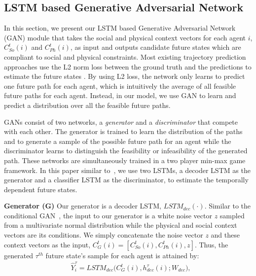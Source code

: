 \documentclass[10pt,twocolumn,letterpaper]{article}
\begin{document}
\subsection{LSTM based Generative Adversarial Network}
\label{sec:Generator}
In this section, we present our LSTM based Generative Adversarial Network (GAN) module that takes the social and physical context vectors for each agent $i$, $C^t_{So}(i)$ and $C^t_{Ph}(i)$, as input and outputs candidate future states which are compliant to social and physical constraints. Most existing trajectory prediction approaches use the L2 norm loss between the ground truth and the predictions to estimate the future states \cite{sadeghian2017car}. By using L2 loss, the network only learns to predict one future path for each agent, which is intuitively the average of all feasible future paths for each agent. Instead, in our model, we use GAN to learn and predict a distribution over all the feasible future paths.

GANs consist of two networks, a \emph{generator} and a \emph{discriminator} that compete with each other. The generator is trained to learn the distribution of the paths and to generate a sample of the possible future path for an agent while the discriminator learns to distinguish the feasibility or infeasibility of the generated path. These networks are simultaneously trained in a two player min-max game framework. In this paper similar to~\cite{gupta2018social}, we use two LSTMs, a decoder LSTM as the generator and a classifier LSTM as the discriminator, to estimate the temporally dependent future states.




\textbf{Generator (G)} Our generator is a decoder LSTM, $LSTM_{dec}(\cdot)$. Similar to the conditional GAN~\cite{mirza2014conditional}, the input to our generator is a white noise vector $z$ sampled from a multivariate normal distribution while the physical and social context vectors are its conditions. We simply concatenate the noise vector $z$ and these context vectors as the input, \ie $C^{t}_G(i) = [C^t_{So}(i), C^t_{Ph}(i), z]$. Thus, the generated $\tau^{th}$ future state's sample for each agent is attained by:
\begin{eqnarray}
\label{eq:gen_dec}
& \hat{Y}_i^{\tau} = LSTM_{dec}\big(C^{t}_G(i), h^{\tau}_{dec}(i); W_{dec}\big), 
\end{eqnarray}
\end{document}
